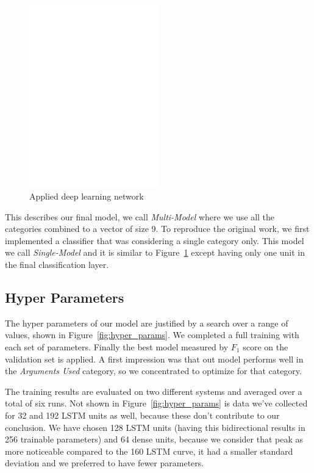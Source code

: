 \documentclass[11pt,a4paper]{article}
\begin{document}
\begin{figure}[h!]
	\centering
	\includegraphics[trim={1cm 19.5cm 5cm 3cm},clip,page=2, width=0.5\textwidth]{img/model}
	\caption{Applied deep learning network}
	\label{fig:model}
\end{figure}

This describes our final model, we call \textit{Multi-Model} where we use all the categories combined to a vector of size 9.
To reproduce the original work, we first implemented a classifier that was considering a single category only. 
This model we call \textit{Single-Model} and it is similar to Figure~\ref{fig:model} except having only one unit in the final classification layer.


\subsection{Hyper Parameters}

The hyper parameters of our model are justified by a search over a range of values, shown in Figure~\ref{fig:hyper_params}. 
We completed a full training with each set of parameters. Finally the best model measured by $F_1$ score on the validation set is applied. 
A first impression was that out model performs well in the \textit{Arguments Used} category, so we concentrated to optimize for that category.

The training results are evaluated on two different systems and averaged over a total of six runs. 
Not shown in Figure~\ref{fig:hyper_params} is data we've collected for 32 and 192 LSTM units as well, because these don't contribute to our conclusion. 
We have chosen 128 LSTM units (having this bidirectional results in 256 trainable parameters) and 64 dense units, because we consider that peak as more  
noticeable compared to the 160 LSTM curve, it had a smaller standard deviation and we preferred to have fewer parameters.
\end{document}
